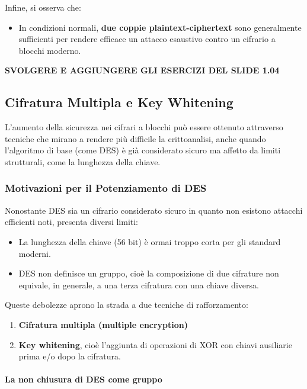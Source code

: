 \documentclass{report}
\begin{document}
Infine, si osserva che:
\begin{itemize}
    \item In condizioni normali, \textbf{due coppie plaintext-ciphertext} sono generalmente sufficienti per rendere efficace un attacco esaustivo contro un cifrario a blocchi moderno.
\end{itemize}


\textbf{SVOLGERE E AGGIUNGERE GLI ESERCIZI DEL SLIDE 1.04}

\subsection{Cifratura Multipla e Key Whitening}

L'aumento della sicurezza nei cifrari a blocchi può essere ottenuto attraverso tecniche che mirano a rendere più difficile la crittoanalisi, anche quando l'algoritmo di base (come DES) è già considerato sicuro ma affetto da limiti strutturali, come la lunghezza della chiave.

\subsubsection{Motivazioni per il Potenziamento di DES}

Nonostante DES sia un cifrario considerato sicuro in quanto non esistono attacchi efficienti noti, presenta diversi limiti:
\begin{itemize}
    \item La lunghezza della chiave (56 bit) è ormai troppo corta per gli standard moderni.
    \item DES non definisce un gruppo, cioè la composizione di due cifrature non equivale, in generale, a una terza cifratura con una chiave diversa.
\end{itemize}

Queste debolezze aprono la strada a due tecniche di rafforzamento:
\begin{enumerate}
    \item \textbf{Cifratura multipla (multiple encryption)}
    \item \textbf{Key whitening}, cioè l'aggiunta di operazioni di XOR con chiavi ausiliarie prima e/o dopo la cifratura.
\end{enumerate}

\paragraph{La non chiusura di DES come gruppo}
\end{document}
